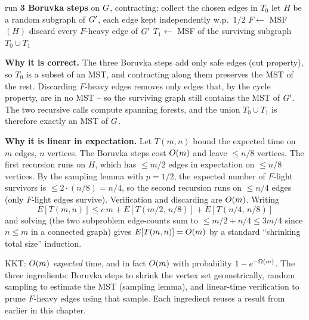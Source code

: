 \begin{algorithm}[H]
\caption{KKT randomized MST (expected $\Oh(m)$)}
\label{ch06:kkt}
run \textbf{3 Boruvka steps} on $G$, contracting; collect the chosen edges in $T_0$\;
let $H$ be a random subgraph of $G'$, each edge kept independently w.p.\ $1/2$\;
$F\gets$ MSF$(H)$ 
discard every $F$-heavy edge of $G'$ 
$T_1\gets$ MSF of the surviving subgraph 
\Return $T_0\cup T_1$\;
\end{algorithm}

\begin{whybox}
\textbf{Why it is correct.} The three Boruvka steps add only safe edges (cut property), so $T_0$ is a subset of an MST, and contracting along them preserves the MST of the rest. Discarding $F$-heavy edges removes only edges that, by the cycle property, are in no MST -- so the surviving graph still contains the MST of $G'$. The two recursive calls compute spanning forests, and the union $T_0\cup T_1$ is therefore exactly an MST of $G$.

\textbf{Why it is linear in expectation.} Let $T(m,n)$ bound the expected time on $m$ edges, $n$ vertices. The Boruvka steps cost $\Oh(m)$ and leave $\le n/8$ vertices. The first recursion runs on $H$, which has $\le m/2$ edges in expectation on $\le n/8$ vertices. By the sampling lemma with $p=1/2$, the expected number of $F$-light survivors is $\le 2\cdot(n/8)=n/4$, so the second recursion runs on $\le n/4$ edges (only $F$-light edges survive). Verification and discarding are $\Oh(m)$. Writing
\[ E[T(m,n)] \le c\,m + E[T(m/2,\,n/8)] + E[T(n/4,\,n/8)] \]
and solving (the two subproblem edge-counts sum to $\le m/2 + n/4 \le 3m/4$ since $n\le m$ in a connected graph) gives $E[T(m,n)]=O(m)$ by a standard ``shrinking total size'' induction.
\end{whybox}

\begin{complexitybox}
KKT: $\Oh(m)$ \emph{expected} time, and in fact $\Oh(m)$ with probability $1-e^{-\Omega(m)}$. The three ingredients: Boruvka steps to shrink the vertex set geometrically, random sampling to estimate the MST (sampling lemma), and linear-time verification to prune $F$-heavy edges using that sample. Each ingredient reuses a result from earlier in this chapter.
\end{complexitybox}

